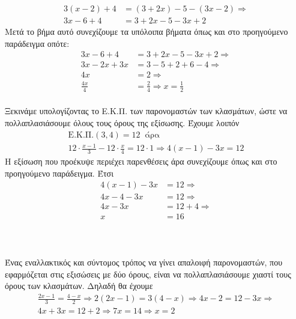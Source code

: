 \documentclass[twoside,nofonts,internet,methodoi]{thewria}
\begin{document}
\begin{align*}
3(x-2)+4&=(3+2x)-5-(3x-2)\Rightarrow\\
3x-6+4&=3+2x-5-3x+2
\end{align*}
Μετά το βήμα αυτό συνεχίζουμε τα υπόλοιπα βήματα όπως και στο προηγούμενο παράδειγμα οπότε:
\begin{align*}
3x-6+4&=3+2x-5-3x+2\Rightarrow\\
3x-2x+3x&=3-5+2+6-4\Rightarrow\\
4x&=2\Rightarrow\\
\frac{4x}{4}&=\frac{2}{4}\Rightarrow x=\frac{1}{2}
\end{align*}
\lysh\\
Ξεκινάμε υπολογίζοντας το Ε.Κ.Π. των παρονομαστών των κλασμάτων, ώστε να πολλαπλασιάσουμε όλους τους όρους της εξίσωσης. Έχουμε λοιπόν
\begin{gather*}
\textrm{Ε.Κ.Π.}(3,4)=12\ \textrm{ άρα}\\
12\cdot\frac{x-1}{3}-12\cdot\frac{x}{4}=12\cdot 1\Rightarrow 4(x-1)-3x=12
\end{gather*}
Η εξίσωση που προέκυψε περιέχει παρενθέσεις άρα συνεχίζουμε όπως και στο προηγούμενο παράδειγμα. Έτσι
\begin{align*}
4(x-1)-3x&=12\Rightarrow\\4x-4-3x&=12\Rightarrow\\
4x-3x&=12+4\Rightarrow\\ x&=16
\end{align*}
\\\\
\lysh\\
Ένας εναλλακτικός και σύντομος τρόπος να γίνει απαλοιφή παρονομαστών, που εφαρμόζεται στις εξισώσεις με δύο όρους, είναι να πολλαπλασιάσουμε χιαστί τους όρους των κλασμάτων. Δηλαδή θα έχουμε
\begin{gather*}
\frac{2x-1}{3}=\frac{4-x}{2}\Rightarrow 2(2x-1)=3(4-x)\Rightarrow 4x-2=12-3x\Rightarrow\\ 4x+3x=12+2\Rightarrow 7x=14\Rightarrow x=2
\end{gather*}
\end{document}
